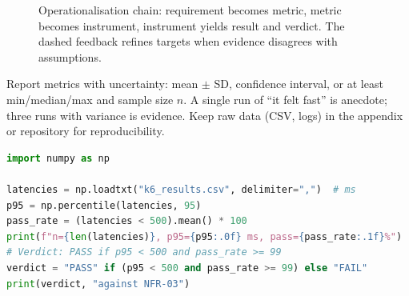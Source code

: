 \begin{figure}[h]
\centering
{}
\caption{Operationalisation chain: requirement becomes metric, metric becomes instrument, instrument yields result and verdict. The dashed feedback refines targets when evidence disagrees with assumptions.}
\label{fig:operationalisation}
\end{figure}

Report metrics with uncertainty: mean $\pm$ SD, confidence interval, or at least min/median/max and sample size $n$. A single run of ``it felt fast'' is anecdote; three runs with variance is evidence. Keep raw data (CSV, logs) in the appendix or repository for reproducibility.

\begin{lstlisting}[language=Python,caption={From raw latencies to a report-ready result: p95 and pass rate with explicit n.},label={lst:metrics-eval}]
import numpy as np

latencies = np.loadtxt("k6_results.csv", delimiter=",")  # ms
p95 = np.percentile(latencies, 95)
pass_rate = (latencies < 500).mean() * 100
print(f"n={len(latencies)}, p95={p95:.0f} ms, pass={pass_rate:.1f}%")
# Verdict: PASS if p95 < 500 and pass_rate >= 99
verdict = "PASS" if (p95 < 500 and pass_rate >= 99) else "FAIL"
print(verdict, "against NFR-03")
\end{lstlisting}

